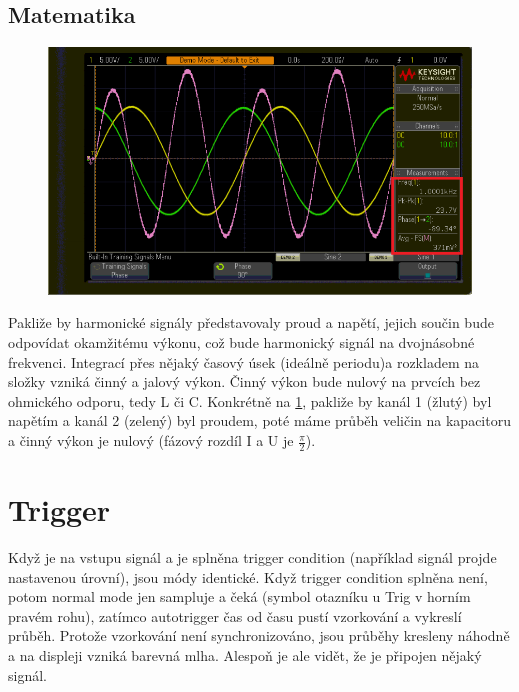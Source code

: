 \documentclass[twoside]{article}
\begin{document}
\subsection{Matematika}
\begin{figure}[htbp]
	\centering
	\includegraphics[width=.6\linewidth]{sinus_matematika_stredni_hodnota.png  }
	\label{fig:vykon}
\end{figure}
Pakliže by harmonické signály představovaly proud a napětí, jejich součin bude odpovídat okamžitému výkonu,
což bude harmonický signál na dvojnásobné frekvenci.
Integrací přes nějaký časový úsek (ideálně periodu)a rozkladem na složky vzniká činný a jalový výkon.
Činný výkon bude nulový na prvcích bez ohmického odporu, tedy L či C. Konkrétně na \ref{fig:vykon},
pakliže by kanál 1 (žlutý) byl napětím a kanál 2 (zelený) byl proudem, poté máme průběh
veličin na kapacitoru a činný výkon je nulový (fázový rozdíl I a U je $\frac{\pi}{2}$). 


\section{Trigger}

Když je na vstupu signál a je splněna trigger condition (například signál projde nastavenou úrovní),
jsou módy identické. Když trigger condition splněna není, potom normal mode jen sampluje a čeká
(symbol otazníku u Trig v horním pravém rohu), zatímco autotrigger čas od času pustí vzorkování a vykreslí
průběh. Protože vzorkování není synchronizováno, jsou průběhy kresleny náhodně a na displeji vzniká
barevná mlha. Alespoň je ale vidět, že je připojen nějaký signál.
\end{document}
